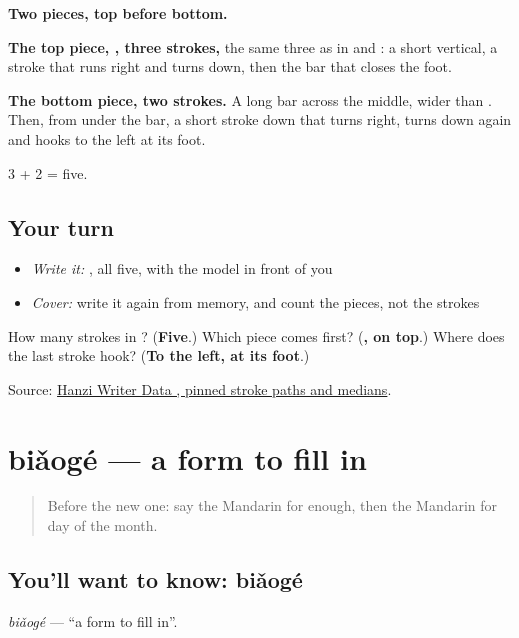 \begin{quote}
\end{quote}

\textbf{Two pieces, top before bottom.}

\textbf{The top piece, , three strokes,} the same three as in  and : a short vertical, a stroke that runs right and turns down, then the bar that closes the foot.

\textbf{The bottom piece, two strokes.} A long bar across the middle, wider than . Then, from under the bar, a short stroke down that turns right, turns down again and hooks to the left at its foot.

3 + 2 = five.

\subsection*{Your turn}
\begin{itemize}
\raggedright
  \item \emph{Write it:} , all five, with the model in front of you
  \item \emph{Cover:} write it again from memory, and count the pieces, not the strokes
\end{itemize}

\begin{tcolorbox}[breakable,colback=teal!4,colframe=teal!35!black,title={Before you move on}]
How many strokes in ? (\textbf{Five}.) Which piece comes first? (\textbf{, on top}.) Where does the last stroke hook? (\textbf{To the left, at its foot}.)

Source: \href{https://raw.githubusercontent.com/chanind/hanzi-writer-data/68d10a4b21150cae5e1ebbd223eed289cf32d90c/data/\%E5\%8F\%B7.json}{Hanzi Writer Data , pinned stroke paths and medians}.
\end{tcolorbox}
\section[biǎogé]{biǎogé — a form to fill in}

\label{lesson:ZH-C189-biaoge}



\begin{quote}
Before the new one: say the Mandarin for enough, then the Mandarin for day of the month.
\end{quote}

\subsection*{You'll want to know: biǎogé}
\emph{biǎogé} — \textquotedblleft{}a form to fill in\textquotedblright{}.

